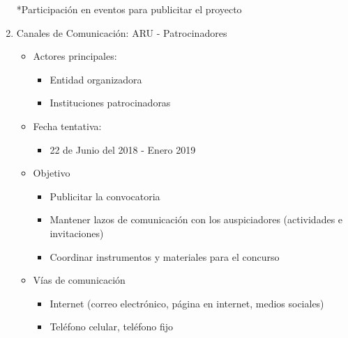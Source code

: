 \documentclass{article}
\begin{document}
\begin{enumerate}
*Participación en eventos para publicitar el proyecto

\item Canales de Comunicación: ARU - Patrocinadores
\begin{itemize}
\item Actores principales:
\begin{itemize}
\item Entidad organizadora
\item Instituciones patrocinadoras
\end{itemize}
\item Fecha tentativa:
\begin{itemize}
\item 22 de Junio del 2018 - Enero 2019
\end{itemize}
\item Objetivo
\begin{itemize}
\item Publicitar la convocatoria
\item Mantener lazos de comunicación con los auspiciadores (actividades e invitaciones)
\item Coordinar instrumentos y materiales para el concurso
\end{itemize}
\item Vías de comunicación
\begin{itemize}
\item Internet (correo electrónico, página en internet, medios sociales)
\item Teléfono celular, teléfono fijo
\end{itemize}
\end{itemize}


\end{enumerate}
\end{document}
